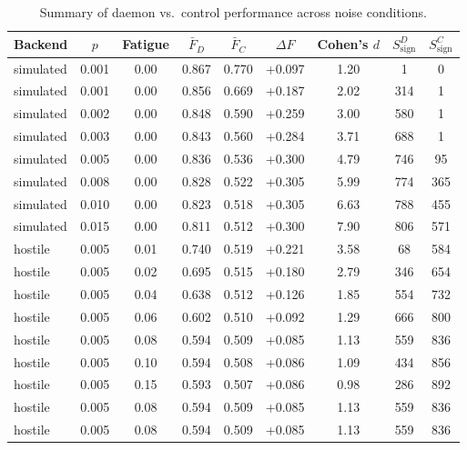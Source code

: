 \begin{table}[h]
\centering
\caption{Summary of daemon vs.\ control performance across noise conditions.}
\label{tab:main_results}
\begin{tabular}{lcccccccc}
\hline
Backend & $p$ & Fatigue & $\bar{F}_D$ & $\bar{F}_C$ & $\Delta F$ & Cohen's $d$ & $S_{\text{sign}}^D$ & $S_{\text{sign}}^C$ \\
\hline
  simulated & 0.001 & 0.00 & 0.867 & 0.770 & +0.097 & 1.20 & 1 & 0 \\
  simulated & 0.001 & 0.00 & 0.856 & 0.669 & +0.187 & 2.02 & 314 & 1 \\
  simulated & 0.002 & 0.00 & 0.848 & 0.590 & +0.259 & 3.00 & 580 & 1 \\
  simulated & 0.003 & 0.00 & 0.843 & 0.560 & +0.284 & 3.71 & 688 & 1 \\
  simulated & 0.005 & 0.00 & 0.836 & 0.536 & +0.300 & 4.79 & 746 & 95 \\
  simulated & 0.008 & 0.00 & 0.828 & 0.522 & +0.305 & 5.99 & 774 & 365 \\
  simulated & 0.010 & 0.00 & 0.823 & 0.518 & +0.305 & 6.63 & 788 & 455 \\
  simulated & 0.015 & 0.00 & 0.811 & 0.512 & +0.300 & 7.90 & 806 & 571 \\
  hostile & 0.005 & 0.01 & 0.740 & 0.519 & +0.221 & 3.58 & 68 & 584 \\
  hostile & 0.005 & 0.02 & 0.695 & 0.515 & +0.180 & 2.79 & 346 & 654 \\
  hostile & 0.005 & 0.04 & 0.638 & 0.512 & +0.126 & 1.85 & 554 & 732 \\
  hostile & 0.005 & 0.06 & 0.602 & 0.510 & +0.092 & 1.29 & 666 & 800 \\
  hostile & 0.005 & 0.08 & 0.594 & 0.509 & +0.085 & 1.13 & 559 & 836 \\
  hostile & 0.005 & 0.10 & 0.594 & 0.508 & +0.086 & 1.09 & 434 & 856 \\
  hostile & 0.005 & 0.15 & 0.593 & 0.507 & +0.086 & 0.98 & 286 & 892 \\
  hostile & 0.005 & 0.08 & 0.594 & 0.509 & +0.085 & 1.13 & 559 & 836 \\
  hostile & 0.005 & 0.08 & 0.594 & 0.509 & +0.085 & 1.13 & 559 & 836 \\
\hline
\end{tabular}
\end{table}